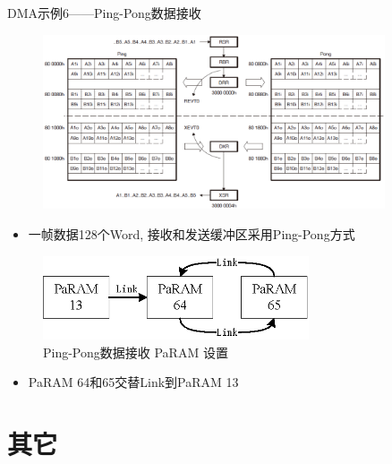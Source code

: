 \documentclass[10pt]{ctexbeamer}
\begin{document}
    \begin{frame}[allowframebreaks]{DMA示例6——Ping-Pong数据接收}
        \begin{figure}
            \centering
            \includegraphics[width=0.9\textwidth]{summary/22.eps}
        \end{figure}
        \vspace{0.5cm}
        \begin{itemize}
            \item 一帧数据128个Word, 接收和发送缓冲区采用Ping-Pong方式
        \end{itemize}
        
        \begin{figure}
            \centering
            \includegraphics[width=0.7\textwidth]{summary/23.eps}
            \caption{Ping-Pong数据接收 PaRAM 设置}
        \end{figure}
        \begin{itemize}
            \item PaRAM 64和65交替Link到PaRAM 13
        \end{itemize}
    \end{frame}

\section{其它}
\end{document}
